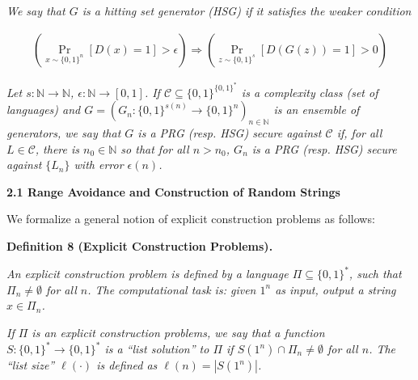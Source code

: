 \emph{We say that $G$ is a hitting set generator (HSG) if it satisfies the weaker condition}\par


\[\begin{gathered}
(\Pr_{x\sim\{0,1\}^{n}}[D(x)=1]>\epsilon)\Rightarrow(\Pr_{z\sim\{0,1\}^{s}}[D(G(z))=1]>0)
\end{gathered}\]




\emph{Let $s:\mathbb{N}\to\mathbb{N}$, $\epsilon:\mathbb{N}\to[0,1]$. If $\mathcal{C}\subseteq\{0,1\}^{\{0,1\}^{*}}$ is a complexity class (set of languages) and $G=(G_{n}:\{0,1\}^{s(n)}\to\{0,1\}^{n})_{n\in\mathbb{N}}$ is an ensemble of generators, we say that $G$ is a PRG (resp. HSG) secure against $\mathcal{C}$ if, for all $L\in\mathcal{C}$, there is $n_{0}\in\mathbb{N}$ so that for all $n>n_{0}$, $G_{n}$ is a PRG (resp. HSG) secure against $\{L_{n}\}$ with error $\epsilon(n)$.}\par






\par\medskip\noindent\textbf{
2.1 Range Avoidance and Construction of Random Strings}\par




We formalize a general notion of explicit construction problems as follows:\par





\par\medskip\noindent\textbf{
\textbf{Definition 8}\textbf{ }(Explicit Construction Problems)\textbf{.}
}\par



\emph{An explicit construction problem is defined by a language $\Pi\subseteq\{0,1\}^{*}$, such that $\Pi_{n}\neq\emptyset$ for all $n$. The computational task is: given $1^{n}$ as input, output a string $x\in\Pi_{n}$.}\par




\emph{If $\Pi$ is an explicit construction problems, we say that a function $S:\{0,1\}^{*}\to\{0,1\}^{*}$ is a “list solution” to $\Pi$ if $S(1^{n})\cap\Pi_{n}\neq\emptyset$ for all $n$. The “list size” $\ell(\cdot)$ is defined as $\ell(n)=|S(1^{n})|$.}\par



